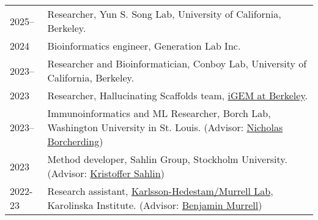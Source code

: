 
\begin{longtable}[l]{@{}p{} p{}}

    2025-- & Researcher, Yun S. Song Lab, University of California, Berkeley. \\

    2024 & Bioinformatics engineer, Generation Lab Inc. \\

    2023-- & Researcher and Bioinformatician, Conboy Lab, University of California, Berkeley. \\

    2023 & Researcher, Hallucinating Scaffolds team, \href{https://igem.studentorg.berkeley.edu/teams/hallucinating-scaffolds/}{iGEM at Berkeley}. \\

    2023-- & Immunoinformatics and ML Researcher, Borch Lab, Washington University in St. Louis. (Advisor: \href{https://www.borch.dev/}{Nicholas Borcherding}) \\

    2023 & Method developer, Sahlin Group, Stockholm University. (Advisor: \href{https://www.scilifelab.se/researchers/kristoffer-sahlin/}{Kristoffer Sahlin}) \\

    2022-23 & Research assistant, \href{https://ki.se/en/people/benjamin-murrell}{Karlsson-Hedestam/Murrell Lab}, Karolinska Institute. (Advisor: \href{https://ki.se/en/people/benjamin-murrell}{Benjamin Murrell}) \\

\end{longtable}
